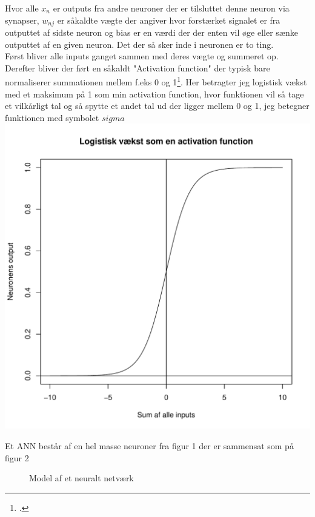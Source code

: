 Hvor alle $x_n$ er outputs fra andre neuroner der er tilsluttet denne neuron via synapser, $w_{nj}$ er såkaldte vægte der angiver hvor
forstærket signalet er fra outputtet af sidste neuron og bias er en værdi der der enten vil øge eller
sænke outputtet af en given neuron. Det der så sker inde i neuronen er to ting. \\
Først bliver alle inputs ganget sammen med deres vægte og summeret op. \\
Derefter bliver der ført en såkaldt "Activation function" der typisk bare normaliserer
summationen mellem f.eks 0 og 1\footcite{ANN11}. Her betragter jeg logistisk vækst med et maksimum på 1 som min activation function, hvor
funktionen vil så tage et vilkårligt tal og så spytte et andet tal ud der ligger mellem 0 og 1, jeg betegner funktionen med symbolet $sigma$
\includegraphics[width=\textwidth]{diagrammer/sigmoid.pdf}

Et ANN består af en hel masse neuroner fra figur 1 der er sammensat som på figur 2

\begin{figure}
\label{netvaerk}
\caption{Model af et neuralt netværk}

\end{figure}

